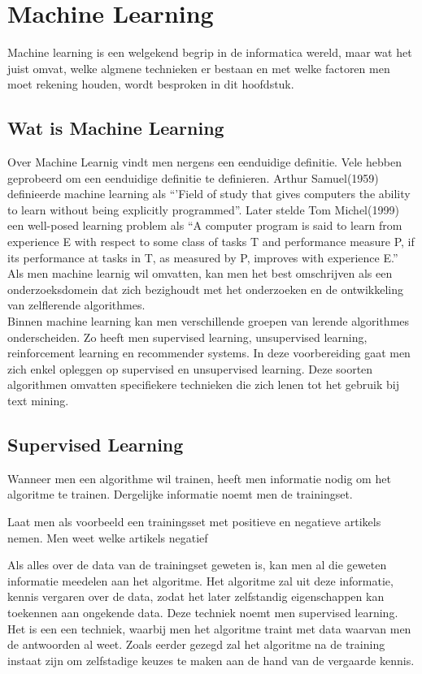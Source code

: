 \chapter{Machine Learning}\label{Machine Learning}

Machine learning is een welgekend begrip in de informatica wereld, maar wat het juist omvat, welke algmene technieken er bestaan en met welke factoren men moet rekening houden, wordt besproken in dit hoofdstuk.

\section{Wat is Machine Learning}\label{Wat is Machine Learning}

Over Machine Learnig vindt men nergens een eenduidige definitie. Vele hebben geprobeerd om een eenduidige definitie te definieren. Arthur Samuel(1959) definieerde machine learning als ``'Field of study that gives computers the ability to learn without being explicitly programmed''. Later stelde Tom Michel(1999) een well-posed learning problem als ``A computer program is said to learn from experience E with respect to some class of tasks T and performance measure P, if its performance at tasks in T, as measured by P, improves with experience E.'' Als men machine learnig wil omvatten, kan men het best omschrijven als een onderzoeksdomein dat zich bezighoudt met het onderzoeken en de ontwikkeling van zelflerende algorithmes.
\\
Binnen machine learning kan men verschillende groepen van lerende algorithmes onderscheiden. Zo heeft men supervised learning, unsupervised learning, reinforcement learning en recommender systems. In deze voorbereiding gaat men zich enkel opleggen op supervised en unsupervised learning. Deze soorten algorithmen omvatten specifiekere technieken die zich lenen tot het gebruik bij text mining.


\section{Supervised Learning}\label{Supervised Learning}

Wanneer men een algorithme wil trainen, heeft men informatie nodig om het algoritme te trainen. Dergelijke informatie noemt men de trainingset.

Laat men als voorbeeld een trainingsset met positieve en negatieve artikels nemen. Men weet welke artikels negatief 

  Als alles over de data van de trainingset geweten is, kan men al die geweten informatie meedelen aan het algoritme. Het algoritme zal uit deze informatie, kennis vergaren over de data, zodat het later zelfstandig eigenschappen kan toekennen aan ongekende data. Deze techniek noemt men supervised learning. Het is een een techniek, waarbij men het algoritme traint met data waarvan men de antwoorden al weet. Zoals eerder gezegd zal het algoritme na de training instaat zijn om zelfstadige keuzes te maken aan de hand van de vergaarde kennis.

